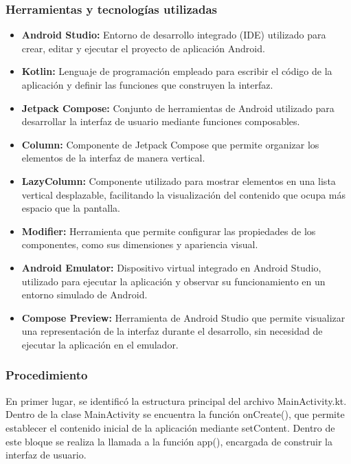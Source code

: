 \documentclass[12pt,a4paper]{article}
\begin{document}
\subsubsection{Herramientas y tecnologías utilizadas}
\begin{itemize}
	
	\item \textbf{Android Studio:} Entorno de desarrollo integrado (IDE) utilizado para crear, editar y ejecutar el proyecto de aplicación Android.
	
	\item \textbf{Kotlin:} Lenguaje de programación empleado para escribir el código de la aplicación y definir las funciones que construyen la interfaz.
	
	\item \textbf{Jetpack Compose:} Conjunto de herramientas de Android utilizado para desarrollar la interfaz de usuario mediante funciones composables.
	
	\item \textbf{Column:} Componente de Jetpack Compose que permite organizar los elementos de la interfaz de manera vertical.
	
	\item \textbf{LazyColumn:} Componente utilizado para mostrar elementos en una lista vertical desplazable, facilitando la visualización del contenido que ocupa más espacio que la pantalla.
	
	\item \textbf{Modifier:} Herramienta que permite configurar las propiedades de los componentes, como sus dimensiones y apariencia visual.
	
	\item \textbf{Android Emulator:} Dispositivo virtual integrado en Android Studio, utilizado para ejecutar la aplicación y observar su funcionamiento en un entorno simulado de Android.
	
	\item \textbf{Compose Preview:} Herramienta de Android Studio que permite visualizar una representación de la interfaz durante el desarrollo, sin necesidad de ejecutar la aplicación en el emulador.
	
\end{itemize}
\subsubsection{Procedimiento}
En primer lugar, se identificó la estructura principal
del archivo MainActivity.kt. Dentro de la clase
MainActivity se encuentra la función onCreate(), que
permite establecer el contenido inicial de la aplicación
mediante setContent. Dentro de este bloque se realiza
la llamada a la función app(), encargada de construir
la interfaz de usuario.
\end{document}
